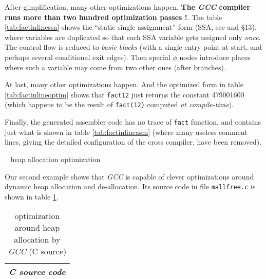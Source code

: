 After gimplification, many other optimizations happen. \textbf{The
  \emph{GCC} compiler runs more than two hundred optimization passes
  !}. The table
\ref{tab:factinlinessa} shows the ``static single assignment'' form
(SSA, see \cite{pop:ssa} and \cite{gcc-internals} \S13), where variables are duplicated so that each SSA
variable gets assigned only \emph{once}. The control flow is reduced
to  \emph{basic blocks} (with a single entry point
at start, and perhaps several conditional exit edges). Then special
$\phi$ nodes introduce places where such a variable may come from two
other ones (after branches).




At last, many other optimizations happen. And the optimized form in
table \ref{tab:factinlineoptim} shows that \texttt{fact12} just
returns the constant 479001600 (which happens to be the result of
\texttt{fact(12)} computed \emph{at compile-time}).

\newpage

Finally, the generated assembler code has no trace of \texttt{fact}
function, and contains just what is shown in table
\ref{tab:factinlineasm} (where many useless comment lines, giving the
detailed configuration of the cross compiler, have been removed).



\pagebreak



{{\raisebox{3pt}{\textcolor{brown}{\rule{0.2\textwidth}{2.0pt}}}} ~ \large{heap allocation optimization}}

\bigskip

Our second example shows that \emph{GCC} is capable of clever
optimizations around dynamic heap allocation and de-allocation. Its
source code in file \texttt{mallfree.c} is shown in table
\ref{tab:mallfreecsrc}.

\begin{table}[!htbp]
\caption{\label{tab:mallfreecsrc} optimization around heap allocation by \emph{GCC} (C source)}
   \medskip
  \begin{center}
    \begin{relsize}{-1.2}
     \begin{tabular}{c}
       \\ 
       \textbf{\emph{C source code}} \\ 
       \hline
     \end{tabular}
    \end{relsize}
  \end{center}
\end{table}

